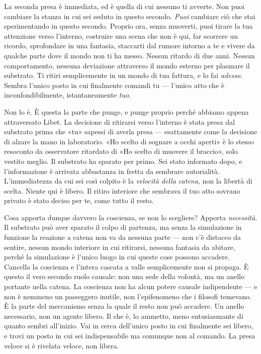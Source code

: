 \documentclass[11pt, twoside, openright]{book}
\begin{document}
La seconda presa è immediata, ed è quella di cui nessuno ti avverte. Non puoi cambiare la stanza in cui sei seduto in questo secondo. \textit{Puoi} cambiare ciò che stai sperimentando in questo secondo. Proprio ora, senza muoverti, puoi tirare la tua attenzione verso l'interno, costruire una scena che non è qui, far scorrere un ricordo, sprofondare in una fantasia, staccarti dal rumore intorno a te e vivere da qualche parte dove il mondo non ti ha messo. Nessun ritardo di due anni. Nessun comportamento, nessuna deviazione attraverso il mondo esterno per plasmare il substrato. Ti ritiri semplicemente in un mondo di tua fattura, e lo fai \textit{adesso}. Sembra l'unico posto in cui finalmente comandi tu --- l'unico atto che è inconfondibilmente, istantaneamente \textit{tuo}.

Non lo è. È questa la parte che punge, e punge proprio perché abbiamo appena attraversato Libet. La decisione di ritirarsi verso l'interno è stata presa dal substrato prima che «tu» sapessi di averla presa --- esattamente come la decisione di alzare la mano in laboratorio. «Ho scelto di sognare a occhi aperti» è lo stesso resoconto da osservatore ritardato di «Ho scelto di muovere il braccio», solo vestito meglio. Il substrato ha sparato per primo. Sei stato informato dopo, e l'informazione è arrivata abbastanza in fretta da sembrare autorialità. L'immediatezza da cui sei così colpito è la \textit{velocità della catena}, non la libertà di scelta. Niente qui è libero. Il ritiro interiore che sembrava il tuo atto sovrano privato è stato deciso per te, come tutto il resto.

Cosa apporta dunque davvero la coscienza, se non lo scegliere? Apporta \textit{necessità}. Il substrato può aver sparato il colpo di partenza, ma senza la simulazione in funzione la reazione a catena non va da nessuna parte --- non c'è distacco da sentire, nessun mondo interiore in cui ritirarsi, nessuna fantasia da abitare, perché la simulazione è l'unico luogo in cui queste cose possono accadere. Cancella la coscienza e l'intera cascata a valle semplicemente non si propaga. È questo il vero secondo ruolo causale: non una sede della volontà, ma un anello portante nella catena. La coscienza non ha alcun potere causale indipendente --- e non è nemmeno un passeggero inutile, non l'epifenomeno che i filosofi temevano. È la parte del meccanismo senza la quale il resto non può accadere. Un anello necessario, non un agente libero. Il che è, lo ammetto, meno entusiasmante di quanto sembri all'inizio. Vai in cerca dell'unico posto in cui finalmente sei libero, e trovi un posto in cui sei indispensabile ma comunque non al comando. La presa veloce si è rivelata veloce, non libera.
\end{document}
